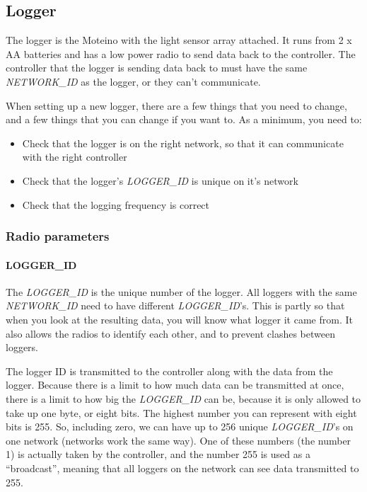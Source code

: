 \documentclass[10pt]{article}
\begin{document}
\subsection{Logger}
The logger is the Moteino with the light sensor array attached. It runs from 2 x AA batteries and has a low power radio to send data back to the controller. The controller
that the logger is sending data back to must have the same \textit{NETWORK\_ID} as the logger, or they can't communicate.

When setting up a new logger, there are a few things that you need to change, and a few things that you can change if you want to. As a minimum, you need to:

\begin{itemize}
 \item Check that the logger is on the right network, so that it can communicate with the right controller
 \item Check that the logger's \textit{LOGGER\_ID} is unique on it's network
 \item Check that the logging frequency is correct
\end{itemize}


\subsubsection{Radio parameters}

\paragraph{LOGGER\_ID}
The \textit{LOGGER\_ID} is the unique number of the logger. All loggers with the same \textit{NETWORK\_ID} need to have different \textit{LOGGER\_ID}'s. This is partly so 
that when you look at the resulting data, you will know what logger it came from. It also allows the radios to identify each other, and to prevent clashes between 
loggers. 

The logger ID is transmitted to the controller along with the data from the logger. Because there is a limit to how much data can be transmitted at once, there is a limit
to how big the \textit{LOGGER\_ID} can be, because it is only allowed to take up one byte, or eight bits. The highest number you can represent with eight bits is 255. So,
including zero, we can have up to 256 unique \textit{LOGGER\_ID}'s on one network (networks work the same way). One of these numbers (the number 1) is actually taken by
the controller, and the number 255 is used as a ``broadcast'', meaning that all loggers on the network can see data transmitted to 255. 
\end{document}
